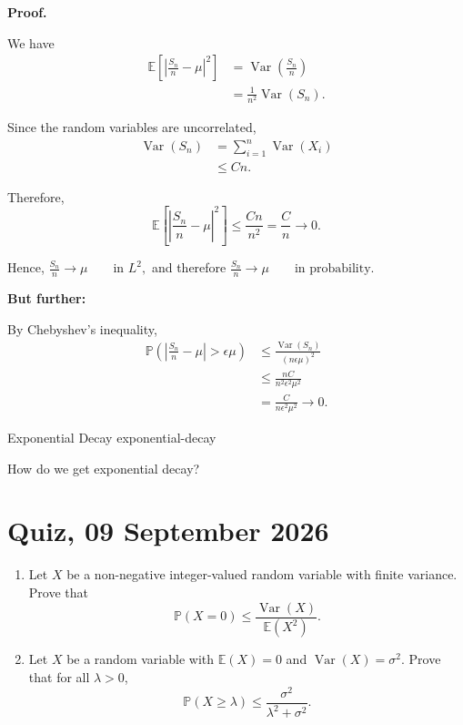 \textbf{Proof.}

We have
\[
\begin{aligned}
    \mathbb{E}
    \left[
        \left|
            \frac{S_n}{n}-\mu
        \right|^2
    \right]
    &=
    \operatorname{Var}
    \left(
        \frac{S_n}{n}
    \right) \\
    &=
    \frac{1}{n^2}
    \operatorname{Var}(S_n).
\end{aligned}
\]

Since the random variables are uncorrelated,
\[
\begin{aligned}
    \operatorname{Var}(S_n)
    &=
    \sum_{i=1}^{n}\operatorname{Var}(X_i) \\
    &\leq
    Cn.
\end{aligned}
\]

Therefore,
\[
    \mathbb{E}
    \left[
        \left|
            \frac{S_n}{n}-\mu
        \right|^2
    \right]
    \leq
    \frac{Cn}{n^2}
    =
    \frac{C}{n}
    \longrightarrow 0.
\]

Hence,
\(
    \frac{S_n}{n}
    \longrightarrow
    \mu
    \qquad\text{in }L^2,
\)
and therefore
\(
    \frac{S_n}{n}
    \longrightarrow
    \mu
    \qquad\text{in probability}.
\)

\textbf{But further:}

By Chebyshev's inequality,
\[
\begin{aligned}
    \mathbb{P}
    \left(
        \left|
            \frac{S_n}{n}-\mu
        \right|
        >
        \epsilon\mu
    \right)
    &\leq
    \frac{
        \operatorname{Var}(S_n)
    }{
        (n\epsilon\mu)^2
    } \\
    &\leq
    \frac{nC}
    {n^2\epsilon^2\mu^2} \\
    &=
    \frac{C}
    {n\epsilon^2\mu^2}
    \longrightarrow 0.
\end{aligned}
\]

\begin{question}
{Exponential Decay}
{exponential-decay}

How do we get exponential decay?
\end{question}


\lectureend



\section{Quiz, 09 September 2026}


\begin{quiz}
\begin{enumerate}
\item Let $X$ be a non-negative integer-valued random variable with finite variance. Prove that
    \[
        \mathbb{P}(X=0) \leq \frac{\operatorname{Var}(X)}{\mathbb{E}(X^2)}.
    \]
    \item Let $X$ be a random variable with $\mathbb{E}(X)=0$ and
    $\operatorname{Var}(X)=\sigma^2$. Prove that for all $\lambda>0$,
    \[
        \mathbb{P}(X\geq \lambda)
        \leq
        \frac{\sigma^2}{\lambda^2+\sigma^2}.
    \]\end{enumerate}
\end{quiz}
